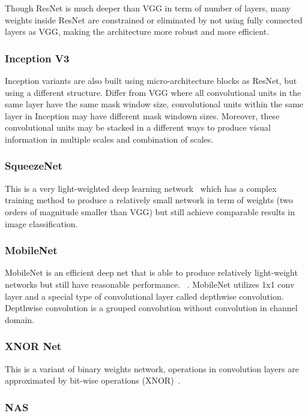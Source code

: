 \documentclass[conference]{IEEEtran}
\begin{document}
Though ResNet is much deeper than VGG in term of number of layers, many weights inside ResNet are constrained or eliminated by not using fully connected layers as VGG, making the architecture more robust and more efficient.

\subsubsection{Inception V3}
Inception variants are also built using micro-architecture blocks as ResNet, but using a different structure. Differ from VGG where all convolutional units in the same layer have the same mask window size, convolutional units within the same layer in Inception may have different mask windown sizes. Moreover, these convolutional units may be stacked in a different ways to produce visual information in multiple scales and combination of scales.  

\subsubsection{SqueezeNet}
This is a very light-weighted deep learning network~\cite{shen2018cs} which has a complex training method to produce a relatively small network in term of weights (two orders of magnitude smaller than VGG) but still achieve comparable results in image classification.

\subsubsection{MobileNet}
MobileNet is an efficient deep net that is able to produce relatively light-weight networks but still have reasonable performance. ~\cite{howard2017mobilenets}. MobileNet utilizes 1x1 conv layer and a special type of convolutional layer called depthwise convolution. Depthwise convolution is a grouped convolution without convolution in channel domain.

\subsubsection{XNOR Net}
This is a variant of binary weights network, operations in convolution layers are approximated by bit-wise operations (XNOR)~\cite{rastegari2016xnor}.

\subsubsection{NAS }
\end{document}
